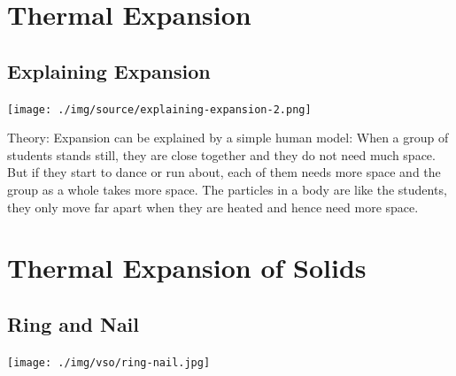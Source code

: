 \section{Thermal Expansion}

\begin{multicols}{2}


\subsection{Explaining Expansion}

\begin{center}
\texttt{[image: ./img/source/explaining-expansion-2.png]}
\end{center}

\begin{description*}
\item[Theory:]{Expansion can be explained by a simple human model: When a group of students stands still, they are close together and they do not need much space. But if they start to dance or run about, each of them needs more space and the group as a whole takes more space. The particles in a body are like the students, they only move far apart when they are heated and hence need more space.}
\end{description*}


\section*{Thermal Expansion of Solids}


\subsection{Ring and Nail}

\begin{center}
\texttt{[image: ./img/vso/ring-nail.jpg]}
\end{center}


\end{multicols}
